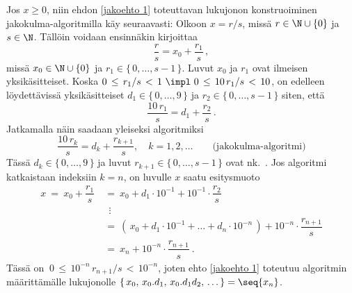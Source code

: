 Jos $x \ge 0$, niin ehdon \eqref{jakoehto 1} toteuttavan lukujonon konstruoiminen 
jakokulma-algoritmilla käy seuraavasti: Olkoon $x = r/s$, missä $r\in\N\cup\{0\}$ ja 
$s \in \N$. Tällöin voidaan ensinnäkin kirjoittaa
\[
\dfrac{r}{s} = x_0 + \dfrac{r_1}{s}\,,
\]
missä $x_0 \in \N \cup \{0\}$ ja $r_1 \in \{\,0, \ldots, s-1\,\}$. Luvut $x_0$ ja $r_1$ ovat
ilmeisen yksikäsitteiset. Koska $0\,\le\,r_1/s\,<\,1\ \impl\ 0\,\le\,10\,r_1/s\,<\,10$, on 
edelleen löydettävissä yksikäsitteiset $d_1 \in \{\,0, \ldots, 9\,\}$ ja 
$r_2 \in \{\,0, \ldots, s-1\,\}$ siten, että
\[
\dfrac{10\,r_1}{s} = d_1 + \dfrac{r_2}{s}\,.
\]
Jatkamalla näin saadaan yleiseksi algoritmiksi
\[
\boxed{\quad \dfrac{10\,r_k}{s} = d_k + \dfrac{r_{k+1}}{s}, \quad 
                     k = 1,2, \ldots \quad \quad \text{(jakokulma-algoritmi)} \quad}
\]
Tässä $d_k \in \{\,0, \ldots, 9\,\}$ ja luvut $r_{k+1} \in \{\,0, \ldots, s-1\,\}$ ovat 
%
nk.\ . Jos algoritmi katkaistaan indeksiin $k=n$, on luvulle $x$ saatu
esitysmuoto
\begin{align*}
x\ =\ x_0 + \dfrac{r_1}{s}\ 
  &=\ x_0 + d_1 \cdot 10^{-1} + 10^{-1} \cdot \dfrac{r_2}{s} \\ 
  &\ \ \vdots \\
  &=\ (\,x_0 + d_1 \cdot 10^{-1} + \ldots + d_n \cdot 10^{-n}\,) 
                                          + 10^{-n} \cdot \dfrac{r_{n+1}}{s} \\
  &=\ x_n + 10^{-n} \cdot \dfrac{r_{n+1}}{s}\ .
\end{align*}
Tässä on $\ 0\,\le\,10^{-n}\,r_{n+1}/s\,<\,10^{-n}$, joten ehto \eqref{jakoehto 1} toteutuu
algoritmin määrittämälle lukujonolle $\{\,x_0,\,x_0.d_1,\,x_0.d_1d_2,\,\ldots\,\} = \seq{x_n}$.

